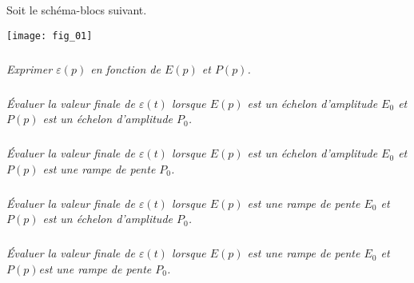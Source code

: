 \setcounter{exo}{0}

Soit le schéma-blocs suivant.
\begin{center}
\texttt{[image: fig\_01]}
\end{center}

\subparagraph{}
\textit{Exprimer $\varepsilon(p)$ en fonction de $E(p)$ et $P(p)$.}

\subparagraph{}
\textit{Évaluer la valeur finale de $\varepsilon(t)$ lorsque $E(p)$ est un échelon d'amplitude $E_0$ et $P(p)$ est un échelon d'amplitude $P_0$.}


\subparagraph{}
\textit{Évaluer la valeur finale de $\varepsilon(t)$ lorsque $E(p)$ est un échelon d'amplitude $E_0$ et $P(p)$ est une rampe de pente $P_0$.}


\subparagraph{}
\textit{Évaluer la valeur finale de $\varepsilon(t)$ lorsque $E(p)$ est une rampe de pente $E_0$ et $P(p)$ est un échelon d'amplitude $P_0$.}


\subparagraph{}
\textit{Évaluer la valeur finale de $\varepsilon(t)$ lorsque $E(p)$ est une rampe de pente $E_0$ et $P(p)$est une rampe de pente  $P_0$.}
